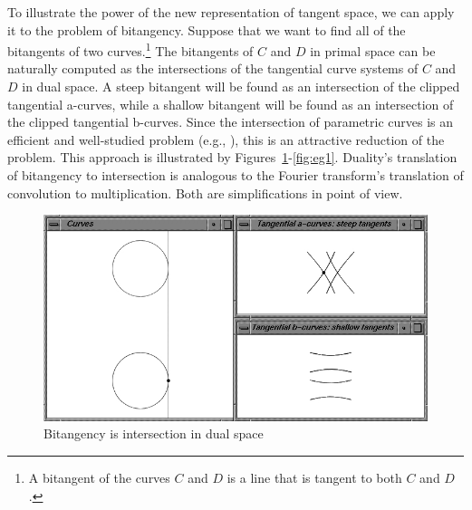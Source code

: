 \documentclass[12pt]{article}
\begin{document}
To illustrate the power of the new representation of tangent space,
we can apply it to the problem of bitangency.
Suppose that we want to find all of the bitangents of two curves.\footnote{A bitangent
	of the curves $C$ and $D$ is a line that is tangent to 
	both $C$ and $D$.}
The bitangents of $C$ and $D$ in primal space can be naturally computed as
the intersections of the tangential curve systems of $C$ and $D$ in dual space.
A steep bitangent will be found as an
intersection of the clipped tangential a-curves, while a shallow bitangent
will be found as an intersection of the clipped tangential b-curves.
Since the intersection of parametric curves is an efficient and well-studied problem
(e.g., \cite{sederberg86}),
this is an attractive reduction of the problem.
This approach is illustrated by Figures~\ref{fig:biTang}-\ref{fig:eg1}.
Duality's translation of bitangency to intersection
is analogous to the Fourier transform's translation of convolution to multiplication.
Both are simplifications in point of view.

\begin{figure}[h]
\begin{center}
\includegraphics*[scale=.6]{img/jjdubi1.jpg}
\end{center}
\caption{Bitangency is intersection in dual space}
\label{fig:biTang}
\end{figure}
\end{document}
